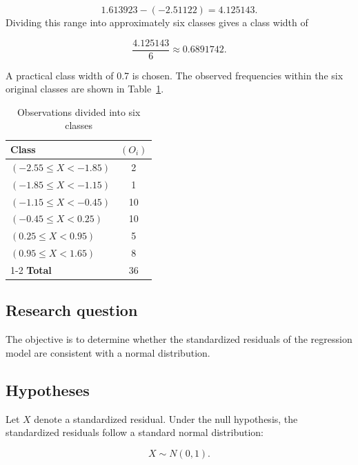 \begin{equation*}
1.613923 - (-2.51122) = 4.125143.
\end{equation*}
Dividing this range into approximately six classes gives a class width of

\begin{equation*}
\frac{4.125143}{6} \approx 0.6891742.
\end{equation*}

A practical class width of 0.7 is chosen. The observed frequencies within the six original classes are shown in Table~\ref{tab:observations_divided_into_6_classes}.

\begin{table}[htbp]
\centering
\begin{tabular}{lc}
\toprule
\textbf{Class} & $(O_i)$ \\
\midrule
$(-2.55 \leq X < -1.85)$ & 2 \\
$(-1.85 \leq X < -1.15)$ & 1 \\
$(-1.15 \leq X < -0.45)$ & 10 \\
$(-0.45 \leq X < 0.25)$ & 10 \\
$(0.25 \leq X < 0.95)$ & 5 \\
$(0.95 \leq X < 1.65)$ & 8 \\
\cmidrule{1-2}
\textbf{Total} & 36 \\
\bottomrule
\end{tabular}
\caption{Observations divided into six classes}
\label{tab:observations_divided_into_6_classes}
\end{table}

\subsection{Research question}

The objective is to determine whether the standardized residuals of the  regression model are consistent with a normal distribution.

\subsection{Hypotheses}

Let $X$ denote a standardized residual. Under the null hypothesis, the standardized residuals follow a standard normal distribution:

\begin{equation*}
X \sim N(0,1).
\end{equation*}

